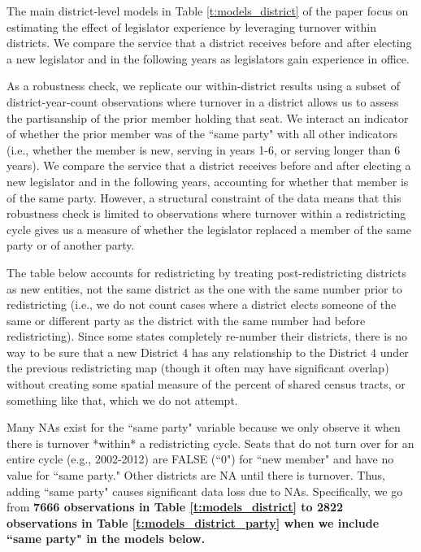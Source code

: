 The main district-level models in Table \ref{t:models_district} of the paper focus on estimating the effect of legislator experience by leveraging turnover within districts. We compare the service that a district receives before and after electing a new legislator and in the following years as legislators gain experience in office.

As a robustness check, we replicate our within-district results using a subset of district-year-count observations where turnover in a district allows us to assess the partisanship of the prior member holding that seat. We interact an indicator of whether the prior member was of the ``same party" with all other indicators (i.e., whether the member is new, serving in years 1-6, or serving longer than 6 years). We compare the service that a district receives before and after electing a new legislator and in the following years, accounting for whether that member is of the same party. However, a structural constraint of the data means that this robustness check is limited to observations where turnover within a redistricting cycle gives us a measure of whether the legislator replaced a member of the same party or of another party. 

The table below accounts for redistricting by treating post-redistricting districts as new entities, not the same district as the one with the same number prior to redistricting (i.e., we do not count cases where a district elects someone of the same or different party as the district with the same number had before redistricting). Since some states completely re-number their districts, there is no way to be sure that a new District 4 has any relationship to the District 4 under the previous redistricting map (though it often may have significant overlap) without creating some spatial measure of the percent of shared census tracts, or something like that, which we do not attempt. 

Many NAs exist for the ``same party" variable because we only observe it when there is turnover *within* a redistricting cycle. Seats that do not turn over for an entire cycle (e.g., 2002-2012) are FALSE (``0") for ``new member" and have no value for ``same party." Other districts are NA until there is turnover. Thus, adding ``same party" causes significant data loss due to NAs. 
Specifically, we go from \textbf{7666 observations in Table \ref{t:models_district} to 2822 observations in Table \ref{t:models_district_party} when we include ``same party" in the models below.}

